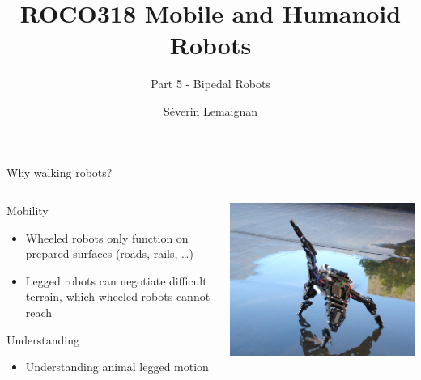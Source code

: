 \documentclass[compress]{beamer}
\title{ROCO318 \newline Mobile and Humanoid Robots}
\subtitle{Part 5 - Bipedal Robots}
\date{}
\author{Séverin Lemaignan}
\institute{Centre for Neural Systems and Robotics\\{\bf Plymouth University}}
\begin{document}

\maketitle


\begin{frame}{Why walking robots?}
    \begin{columns}
        \begin{column}{0.5\linewidth}
    Mobility

    \begin{itemize}

        \item Wheeled robots only function on prepared surfaces (roads, rails, \ldots{})
        \item Legged robots can negotiate difficult terrain, which wheeled robots
            cannot reach
    \end{itemize}

    Understanding

    \begin{itemize}

        \item Understanding animal legged motion
    \end{itemize}
            
        \end{column}
        \begin{column}{0.5\linewidth}
            \begin{center}
                \includegraphics[width=0.8\linewidth]{image1}


\end{center}
\end{column}
\end{columns}
\end{frame}
\end{document}
